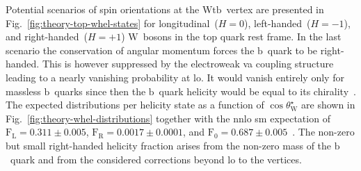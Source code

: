 Potential scenarios of spin orientations at the $\mathrm{Wtb}$~vertex are presented in Fig.~\ref{fig:theory-top-whel-states} for longitudinal~($H=0$), left-handed~($H=-1$), and right-handed~($H=+1$) $\mathrm{W}$~bosons in the top quark rest frame. In the last scenario the conservation of angular momentum forces the $\mathrm{b}$~quark to be right-handed. This is however suppressed by the electroweak \gls{va} coupling structure leading to a nearly vanishing probability at \gls{lo}. It would vanish entirely only for massless $\mathrm{b}$~quarks since then the $\mathrm{b}$~quark helicity would be equal to its chirality~\cite{Bernreuther:2008ju}. The expected distributions per helicity state as a function of $\cos\theta^\star_\mathrm{W}$ are shown in Fig.~\ref{fig:theory-whel-distributions} together with the \gls{nnlo} \gls{sm} expectation of $\mathrm{F}_\mathrm{L}=0.311\pm0.005$, $\mathrm{F}_\mathrm{R}=0.0017\pm0.0001$, and $\mathrm{F}_{0}=0.687\pm0.005$~\cite{Czarnecki:2010gb}. The non-zero but small right-handed helicity fraction arises from the non-zero mass of the $\mathrm{b}$~quark and from the considered corrections beyond \gls{lo} to the vertices.
 
 

